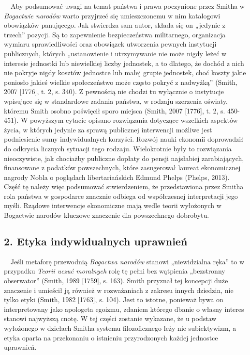 \documentclass[a4paper]{article}
\begin{document}
\ \ Aby podsumować uwagi na temat państwa i prawa poczynione przez Smitha w \textit{Bogactwie narodów }warto przyjrzeć się umieszczonemu w nim katalogowi obowiązków panującego. Jak stwierdza sam autor, składa się on „jedynie z trzech” pozycji. Są to zapewnienie bezpieczeństwa militarnego, organizacja wymiaru sprawiedliwości oraz obowiązek utworzenia pewnych instytucji publicznych, których „ustanowienie i utrzymywanie nie może nigdy leżeć w interesie jednostki lub niewielkiej liczby jednostek, a to dlatego, że dochód z nich nie pokryje nigdy kosztów jednostce lub małej grupie jednostek, choć koszty jakie poniosło jakieś wielkie społeczeństwo może często pokryć z nadwyżką” \label{ref:RNDtabhicNFdT}(Smith, 2007 [1776], t. 2, s. 340). Z pewnością nie chodzi tu wyłącznie o instytucje wpisujące się w standardowe zadania państwa, w rodzaju szerzenia oświaty, któremu Smith osobno poświęcił sporo miejsca \label{ref:RND91wqVhsg2n}(Smith, 2007 [1776], t. 2, s. 450-451). W powyższym cytacie opisano rozwiązania dotyczące wszelkich aspektów życia, w których jedynie za sprawą publicznej interwencji możliwe jest podniesienie sumy indywidualnych korzyści. Rozwój nauki ekonomii doprowadził do odkrycia licznych sytuacji tego rodzaju. Wielokrotnie były to rozwiązania nieoczywiste, jak chociażby publiczne dopłaty do pensji najsłabiej zarabiających, finansowane z podatków powszechnych, które zasugerował laureat ekonomicznej nagrody Nobla o poglądach libertariańskich Edmund Phelps \label{ref:RNDa9f9c5iU52}(Phelps, 2013). Część tę należy więc podsumować stwierdzeniem, że przedstawiona przez Smitha rola państwa w gospodarce znacznie odbiega od współczesnej interpretacji jego myśli. Rządowe interwencje ekonomiczne mają wedle teorii wyłożonych w Bogactwie narodów kluczowe znaczenie dla powszechnego dobrobytu. 

\subsection[2. Etyka indywidualnych uprawnień]{2. Etyka indywidualnych uprawnień}
\ \ Jeśli metaforę przewodnią \textit{Bogactwa narodów} stanowi „niewidzialna ręka” to w przypadku \textit{Teorii uczuć moralnych} rolę tę pełni bez wątpienia „bezstronny obserwator” \label{ref:RNDkXOuGroqna}(Smith, 1989 [1759], s. 163). Smith przyznał tej koncepcji duże znaczenie i umieścił ją również w rozważaniach z zakresu innych dziedzin, nie tylko etyki \label{ref:RND3u7VBrgecb}(Smith, 1982 [1763], s. 104). Jest to istotne, ponieważ bywa on interpretowany jako apologeta egoizmu, zdaniem którego dbanie o własny interes stanowi najwyższą cnotę. W tej części zostanie wykazane, że u podstaw wyłożonego w dziełach Smitha systemu filozoficznego leży nie subiektywizm, a etyka oparta na przekonaniu o istnieniu przyrodzonych każdej jednostce uprawnień.
\end{document}
